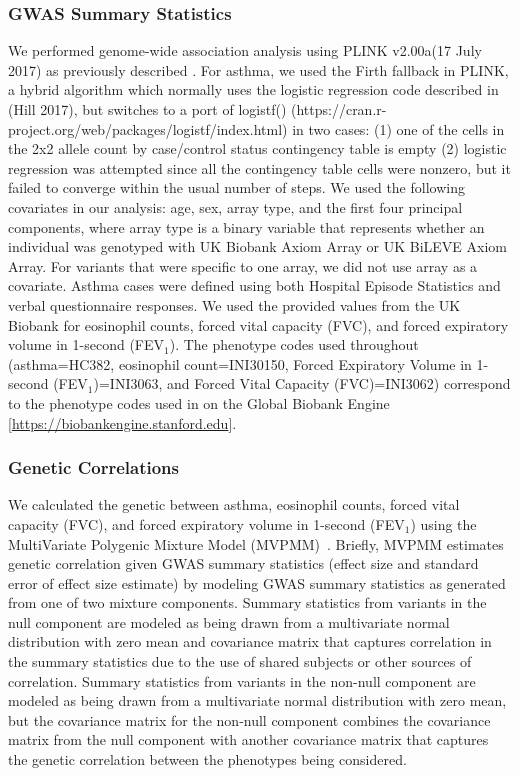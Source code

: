 \subsubsection*{GWAS Summary Statistics}
We performed genome-wide association analysis using PLINK v2.00a(17 July 2017) as previously described \cite{DeBoever179762}. For asthma, we used the Firth fallback in PLINK, a hybrid algorithm which normally uses the logistic regression code described in (Hill 2017), but switches to a port of logistf() (https://cran.r-project.org/web/packages/logistf/index.html) in two cases: (1) one of the cells in the 2x2 allele count by case/control status contingency table is empty (2) logistic regression was attempted since all the contingency table cells were nonzero, but it failed to converge within the usual number of steps. We used the following covariates in our analysis: age, sex, array type, and the first four principal components, where array type is a binary variable that represents whether an individual was genotyped with UK Biobank Axiom Array or UK BiLEVE Axiom Array. For variants that were specific to one array, we did not use array as a covariate. Asthma cases were defined using both Hospital Episode Statistics and verbal questionnaire responses. We used the provided values from the UK Biobank for eosinophil counts, forced vital capacity (FVC), and forced expiratory volume in 1-second (FEV$_1$). The phenotype codes used throughout (asthma=HC382, eosinophil count=INI30150, Forced Expiratory Volume in 1-second (FEV$_1$)=INI3063, and Forced Vital Capacity (FVC)=INI3062) correspond to the phenotype codes used in on the Global Biobank Engine [\url{https://biobankengine.stanford.edu}].

\subsubsection*{Genetic Correlations}
We calculated the genetic between asthma, eosinophil counts, forced vital capacity (FVC), and forced expiratory volume in 1-second (FEV$_1$) using the MultiVariate Polygenic Mixture Model (MVPMM)~\cite{DeBoever2017}. Briefly, MVPMM estimates genetic correlation given GWAS summary statistics (effect size and standard error of effect size estimate) by modeling GWAS summary statistics as generated from one of two mixture components. Summary statistics from variants in the null component are modeled as being drawn from a multivariate normal distribution with zero mean and covariance matrix that captures correlation in the summary statistics due to the use of shared subjects or other sources of correlation. Summary statistics from variants in the non-null component are modeled as being drawn from a multivariate normal distribution with zero mean, but the covariance matrix for the non-null component combines the covariance matrix from the null component with another covariance matrix that captures the genetic correlation between the phenotypes being considered.

